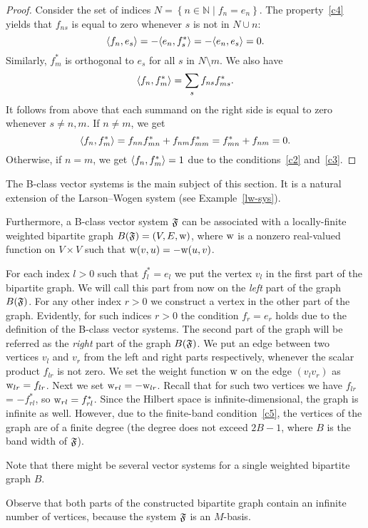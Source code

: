 \documentclass[12pt,oneside,a4paper]{amsart}
\begin{document}
    \begin{proof}
      Consider the set of indices $N = \left\{n \in \mathbb{N} \mid f_n = e_n \right\}$.
      The property~\ref{c4} yields that $f_{ns}$ is equal to zero whenever $s$ is not in $N \cup {n}$:
      \[
        \langle f_n, e_s \rangle = -\langle e_n, f^*_s \rangle = -\langle e_n, e_s \rangle = 0.
      \]
      Similarly, $f^*_m$ is orthogonal to $e_s$ for all $s$ in $N \setminus {m}$.
      We also have
      \[
        \langle f_n, f^*_m \rangle = \sum_{s} f_{ns} f_{ms}^*.
      \]
      It follows from above that each summand on the right side is equal to zero whenever $s \neq n, m$.
      If $n \neq m$, we get
      \[
        \langle f_n, f^*_m \rangle = f_{nn} f^*_{mn} + f_{nm} f^*_{mm}
        = f^*_{mn} + f_{nm} = 0.
      \]
      Otherwise, if $n = m$, we get $\langle f_n, f^*_m \rangle = 1$ due to the conditions~\ref{c2} and~\ref{c3}.
    \end{proof}
    The B-class vector systems is the main subject of this section.
    It is a natural extension of the Larson--Wogen system (see Example~\ref{lw-sys}).

    Furthermore, a B-class vector system $\mathfrak{F}$ can be associated with a
      locally-finite weighted bipartite graph $B(\mathfrak{F}) = (V, E, \mathrm{w})$, where $\mathrm{w}$ is a
      nonzero real-valued function on $V\times V$ such that $\mathrm{w}(v, u) = -\mathrm{w}(u, v)$.

    For each index $l > 0$ such that $f^*_l = e_l$ we put the vertex $v_l$ in the first part of the bipartite graph.
    We will call this part from now on the \emph{left} part of the graph $B(\mathfrak{F})$.
    For any other index $r > 0$ we construct a vertex in the other part of the graph.
    Evidently, for such indices $r > 0$ the condition $f_r = e_r$ holds due to the definition of the B-class vector systems.
    The second part of the graph will be referred as the \emph{right} part of the graph $B(\mathfrak{F})$.
    We put an edge between two vertices $v_l$ and $v_r$ from the left and right parts respectively,
      whenever the scalar product $f_{lr}$ is not zero.
    We set the weight function $\mathrm{w}$ on the edge $(v_l v_r)$ as $\mathrm{w}_{lr} = f_{lr}$.
    Next we set $\mathrm{w}_{rl} = -\mathrm{w}_{lr}$.
    Recall that for such two vertices we have $f_{lr}$ = $-f^*_{rl}$, so $\mathrm{w}_{rl} = f^*_{rl}$.
    Since the Hilbert space is infinite-dimensional, the graph is infinite as well.
    However, due to the finite-band condition~\ref{c5}, the vertices of the graph are of a finite degree (the degree does not
      exceed $2B - 1$, where $B$ is the band width of $\mathfrak{F}$).
    \begin{remark}
      Note that there might be several vector systems for a single weighted bipartite graph $B$.
    \end{remark}
    \begin{remark}
      Observe that both parts of the constructed bipartite graph contain an infinite number of vertices, because
        the system $\mathfrak{F}$ is an $M$-basis.
    \end{remark}
\end{document}
